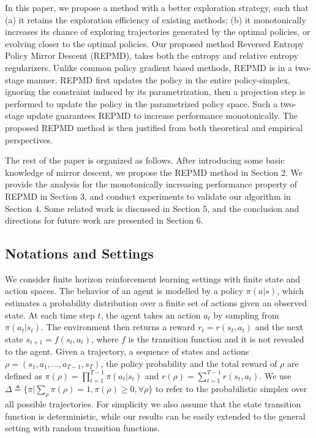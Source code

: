 \documentclass{article}
\begin{document}
In this paper, we propose a method with a better exploration strategy, such that (a) it retains the exploration efficiency of existing methods; (b) it monotonically increases its chance of exploring trajectories generated by the optimal policies, or evolving closer to the optimal policies. Our proposed method Reversed Entropy Policy Mirror Descent (REPMD), takes both the entropy and relative entropy regularizers. Unlike common policy gradient based methods, REPMD is in a two-stage manner.  REPMD first updates the policy in the entire policy-simplex, ignoring the constraint induced by its parametrization, then a projection step is performed to update the policy in the parametrized policy space. Such a two-stage update guarantees REPMD to increase performance monotonically. The proposed REPMD method is then justified from both theoretical and empirical perspectives.


The rest of the paper is organized as follows. After introducing some basic knowledge of mirror descent, we propose the REPMD method in Section 2. We provide the analysis for the monotonically increasing performance property of REPMD in Section 3, and conduct experiments to validate our algorithm in Section 4. Some related work is discussed in Section 5, and the conclusion and directions for future work are presented in Section 6.

\subsection{Notations and Settings}

We consider finite horizon reinforcement learning settings with finite state and action spaces. The behavior of an agent is modelled by a policy $\pi(a|s)$, which estimates a probability distribution over a finite set of actions given an observed state. At each time step $t$, the agent takes an action $a_t$ by sampling from $\pi(a_t | s_t)$. The environment then returns a reward $r_t = r(s_t, a_t)$ and the next state $s_{t+1} = f(s_t, a_t)$, where $f$ is the transition function and it is not revealed to the agent. Given a trajectory, a sequence of states and actions $\rho=(s_1, a_1, \dots, a_{T-1}, s_T)$, the policy probability and the total reward of $\rho$ are defined as $\pi(\rho) = \prod_{t=1}^{T-1} \pi(a_t| s_t)$ and $r(\rho) = \sum_{t=1}^{T-1} r(s_t, a_t)$. We use $\Delta \triangleq \{ \pi | \sum_{\rho}{\pi(\rho)} = 1, \pi(\rho) \ge 0, \forall \rho \}$ to refer to the probabilistic simplex over all possible trajectories. For simplicity we also assume that the state transition function is deterministic, while our results can be easily extended to the general setting with random transition functions.
\end{document}
